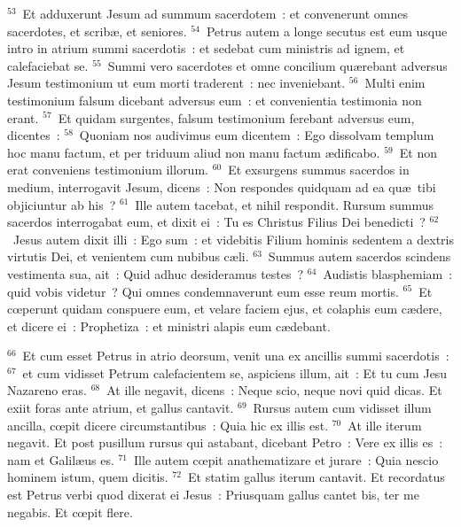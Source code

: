 ${}^{53}$~Et adduxerunt Jesum ad summum sacerdotem~: et convenerunt omnes sacerdotes, et scrib\ae , et seniores.
${}^{54}$~Petrus autem a longe secutus est eum usque intro in atrium summi sacerdotis~: et sedebat cum ministris ad ignem, et calefaciebat se.
${}^{55}$~Summi vero sacerdotes et omne concilium qu\ae rebant adversus Jesum testimonium ut eum morti traderent~: nec inveniebant.
${}^{56}$~Multi enim testimonium falsum dicebant adversus eum~: et convenientia testimonia non erant.
${}^{57}$~Et quidam surgentes, falsum testimonium ferebant adversus eum, dicentes~:
${}^{58}$~Quoniam nos audivimus eum dicentem~: Ego dissolvam templum hoc manu factum, et per triduum aliud non manu factum \ae dificabo.
${}^{59}$~Et non erat conveniens testimonium illorum.
${}^{60}$~Et exsurgens summus sacerdos in medium, interrogavit Jesum, dicens~: Non respondes quidquam ad ea qu\ae\ tibi objiciuntur ab his~?
${}^{61}$~Ille autem tacebat, et nihil respondit. Rursum summus sacerdos interrogabat eum, et dixit ei~: Tu es Christus Filius Dei benedicti~?
${}^{62}$~Jesus autem dixit illi~: Ego sum~: et videbitis Filium hominis sedentem a dextris virtutis Dei, et venientem cum nubibus c\ae li.
${}^{63}$~Summus autem sacerdos scindens vestimenta sua, ait~: Quid adhuc desideramus testes~?
${}^{64}$~Audistis blasphemiam~: quid vobis videtur~? Qui omnes condemnaverunt eum esse reum mortis.
${}^{65}$~Et cœperunt quidam conspuere eum, et velare faciem ejus, et colaphis eum c\ae dere, et dicere ei~: Prophetiza~: et ministri alapis eum c\ae debant.


${}^{66}$~Et cum esset Petrus in atrio deorsum, venit una ex ancillis summi sacerdotis~:
${}^{67}$~et cum vidisset Petrum calefacientem se, aspiciens illum, ait~: Et tu cum Jesu Nazareno eras.
${}^{68}$~At ille negavit, dicens~: Neque scio, neque novi quid dicas. Et exiit foras ante atrium, et gallus cantavit.
${}^{69}$~Rursus autem cum vidisset illum ancilla, cœpit dicere circumstantibus~: Quia hic ex illis est.
${}^{70}$~At ille iterum negavit. Et post pusillum rursus qui astabant, dicebant Petro~: Vere ex illis es~: nam et Galil\ae us es.
${}^{71}$~Ille autem cœpit anathematizare et jurare~: Quia nescio hominem istum, quem dicitis.
${}^{72}$~Et statim gallus iterum cantavit. Et recordatus est Petrus verbi quod dixerat ei Jesus~: Priusquam gallus cantet bis, ter me negabis. Et cœpit flere.

